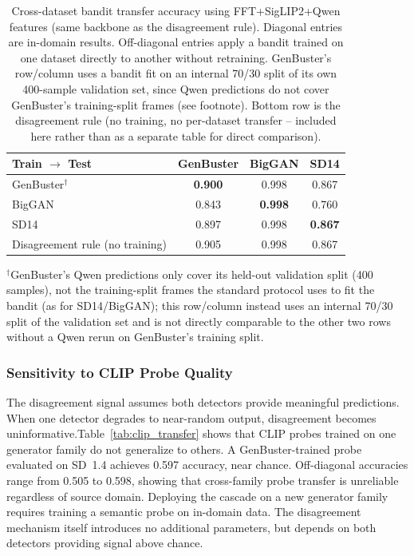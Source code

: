 \documentclass{ieeeaccess}
\begin{document}
\begin{table}[h]
\centering
\caption{Cross-dataset bandit transfer accuracy using FFT+SigLIP2+Qwen features (same
backbone as the disagreement rule). Diagonal entries
are in-domain results. Off-diagonal entries apply a bandit trained on one dataset
directly to another without retraining. GenBuster's row/column uses a bandit fit on an
internal 70/30 split of its own 400-sample validation set, since Qwen predictions do not
cover GenBuster's training-split frames (see footnote). Bottom row is the disagreement
rule (no training, no per-dataset transfer -- included here rather than as a separate
table for direct comparison).}
\label{tab:transfer}
\begin{tabular}{lccc}
\toprule
Train $\rightarrow$ Test & GenBuster & BigGAN & SD14 \\
\midrule
GenBuster$^\dagger$ & \textbf{0.900} & 0.998 & 0.867 \\
BigGAN    & 0.843 & \textbf{0.998} & 0.760 \\
SD14      & 0.897 & 0.998 & \textbf{0.867} \\
\midrule
Disagreement rule (no training) & 0.905 & 0.998 & 0.867 \\
\bottomrule
\end{tabular}
\end{table}
{\footnotesize $^\dagger$GenBuster's Qwen predictions only cover its held-out
validation split (400 samples), not the training-split frames the standard protocol
uses to fit the bandit (as for SD14/BigGAN); this row/column instead uses an internal
70/30 split of the validation set and is not directly comparable to the other two rows
without a Qwen rerun on GenBuster's training split.}


\subsubsection{Sensitivity to CLIP Probe Quality}

The disagreement signal assumes both detectors provide meaningful predictions. When one detector degrades to near-random output, disagreement becomes uninformative.Table~\ref{tab:clip_transfer} shows that CLIP probes trained on one generator family do not generalize to others. A GenBuster-trained probe evaluated on SD~1.4 achieves 0.597
accuracy, near chance. Off-diagonal accuracies range from 0.505 to 0.598, showing that
cross-family probe transfer is unreliable regardless of source domain. Deploying the
cascade on a new generator family requires training a semantic probe on in-domain data.
The disagreement mechanism itself introduces no additional parameters, but depends on
both detectors providing signal above chance.
\end{document}
